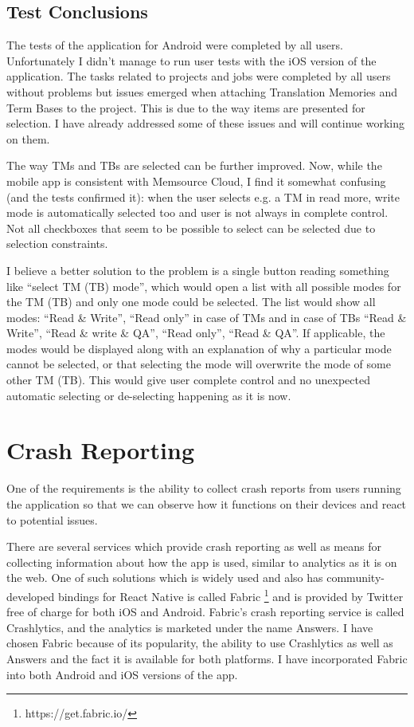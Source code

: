 \subsection{Test Conclusions}

The tests of the application for Android were completed by all users. Unfortunately I didn't manage to run user tests with the iOS version of the application. The tasks related to projects and jobs were completed by all users without problems but issues emerged when attaching Translation Memories and Term Bases to the project. This is due to the way items are presented for selection. I have already addressed some of these issues and will continue working on them.

The way TMs and TBs are selected can be further improved. Now, while the mobile app is consistent with Memsource Cloud, I find it somewhat confusing (and the tests confirmed it): when the user selects e.g. a TM in read more, write mode is automatically selected too and user is not always in complete control. Not all checkboxes that seem to be possible to select can be selected due to selection constraints.

I believe a better solution to the problem is a single button reading something like “select TM (TB) mode”, which would open a list with all possible modes for the TM (TB) and only one mode could be selected. The list would show all modes: “Read \& Write”, “Read only” in case of TMs and in case of TBs “Read \& Write”, “Read \& write \& QA”, “Read only”, “Read \& QA”. If applicable, the modes would be displayed along with an explanation of why a particular mode cannot be selected, or that selecting the mode will overwrite the mode of some other TM (TB). This would give user complete control and no unexpected automatic selecting or de-selecting happening as it is now.


\section{Crash Reporting}


One of the requirements is the ability to collect crash reports from users running the application so that we can observe how it functions on their devices and react to potential issues. 

There are several services which provide crash reporting as well as means for collecting information about how the app is used, similar to analytics as it is on the web. One of such solutions which is widely used and also has community-developed bindings for React Native is called Fabric \footnote{https://get.fabric.io/} and is provided by Twitter free of charge for both iOS and Android. Fabric's crash reporting service is called Crashlytics, and the analytics is marketed under the name Answers. I have chosen Fabric because of its popularity, the ability to use Crashlytics as well as Answers and the fact it is available for both platforms. I have incorporated Fabric into both Android and iOS versions of the app. 

